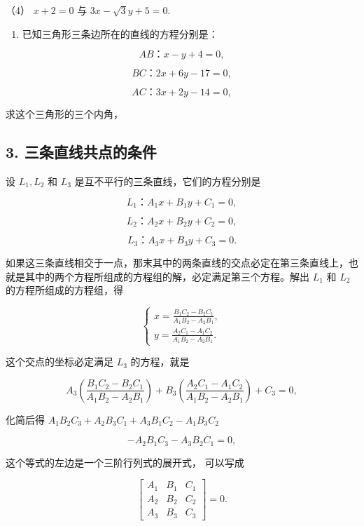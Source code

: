 （4） \(x + 2 = 0\) 与 \(3x - \sqrt{3} y + 5 = 0.\)

\begin{enumerate}
\def\labelenumi{\arabic{enumi}.}
\setcounter{enumi}{1}
\tightlist
\item
  已知三角形三条边所在的直线的方程分别是：
\end{enumerate}

\[
AB\text{：} x - y + 4 = 0,
\]

\[
BC\text{：} 2 x + 6 y - 17 = 0,
\]

\[
AC\text{：} 3 x + 2 y - 14 = 0,
\]

求这个三角形的三个内角，

\subsection{3.
三条直线共点的条件}\label{ux4e09ux6761ux76f4ux7ebfux5171ux70b9ux7684ux6761ux4ef6}

设 \(L_{1}, L_{2}\) 和 \(L_{3}\) 是互不平行的三条直线，它们的方程分别是

\[
L_{1}\text{：} A_{1} x + B_{1} y + C_{1} = 0,
\]

\[
L_{2}\text{：} A_{2} x + B_{2} y + C_{2} = 0,
\]

\[
L_{3}\text{：} A_{3} x + B_{3} y + C_{3} = 0.
\]

如果这三条直线相交于一点，那末其中的两条直线的交点必定在第三条直线上，也就是其中的两个方程所组成的方程组的解，必定满足第三个方程。解出
\(L_{1}\) 和 \(L_{2}\) 的方程所组成的方程组，得

\[
\left\{ \begin{array}{l} x = \frac {B_{1} C_{2} - B_{2} C_{1}}{A_{1} B_{2} - A_{2} B_{1}}, \\ y = \frac {A_{2} C_{1} - A_{1} C_{2}}{A_{1} B_{2} - A_{2} B_{1}}. \end{array} \right.
\]

这个交点的坐标必定满足 \(L_{3}\) 的方程，就是

\[
A_{3} \left(\frac {B_{1} C_{2} - B_{2} C_{1}}{A_{1} B_{2} - A_{2} B_{1}}\right) + B_{3} \left(\frac {A_{2} C_{1} - A_{1} C_{2}}{A_{1} B_{2} - A_{2} B_{1}}\right) + C_{3} = 0,
\]

化简后得
\(A_{1}B_{2}C_{3} + A_{2}B_{3}C_{1} + A_{3}B_{1}C_{2} - A_{1}B_{3}C_{2}\)

\[
- A_{2} B_{1} C_{3} - A_{3} B_{2} C_{1} = 0,
\]

这个等式的左边是一个三阶行列式的展开式， 可以写成

\[
\left[ \begin{array}{ccc} A_{1} & B_{1} & C_{1} \\ A_{2} & B_{2} & C_{2} \\ A_{3} & B_{3} & C_{3} \end{array} \right] = 0.
\]

